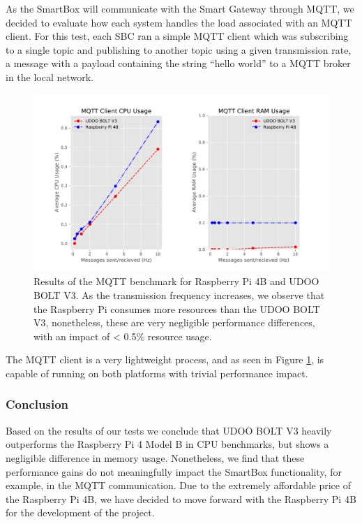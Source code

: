 As the SmartBox will communicate with the Smart Gateway through \acs{MQTT}, we decided to evaluate how each system handles the load associated with an \acs{MQTT} client. For this test, each \acs{SBC} ran a simple \acs{MQTT} client which was subscribing to a single topic and publishing to another topic using a given transmission rate, a message with a payload containing the string ``hello world'' to a \acs{MQTT} broker in the local network.

\begin{figure}[H]
    \centering
    \includegraphics[width=\linewidth]{images/mqtt_test_results.pdf}
    \caption[Results of the \acs{MQTT} benchmark for Raspberry Pi 4B and UDOO BOLT V3.]{Results of the \acs{MQTT} benchmark for Raspberry Pi 4B and UDOO BOLT V3. As the transmission frequency increases, we observe that the Raspberry Pi consumes more resources than the UDOO BOLT V3, nonetheless, these are very negligible performance differences, with an impact of < 0.5\% resource usage.}
    \label{fig:mqtt-tests}
\end{figure}

The \acs{MQTT} client is a very lightweight process, and as seen in Figure \ref{fig:mqtt-tests}, is capable of running on both platforms with trivial performance impact.

\subsubsection{Conclusion}

Based on the results of our tests we conclude that UDOO BOLT V3 heavily outperforms the Raspberry Pi 4 Model B in CPU benchmarks, but shows a negligible difference in memory usage. Nonetheless, we find that these performance gains do not meaningfully impact the SmartBox functionality, for example, in the \acs{MQTT} communication. Due to the extremely affordable price of the Raspberry Pi 4B, we have decided to move forward with the Raspberry Pi 4B for the development of the project.

